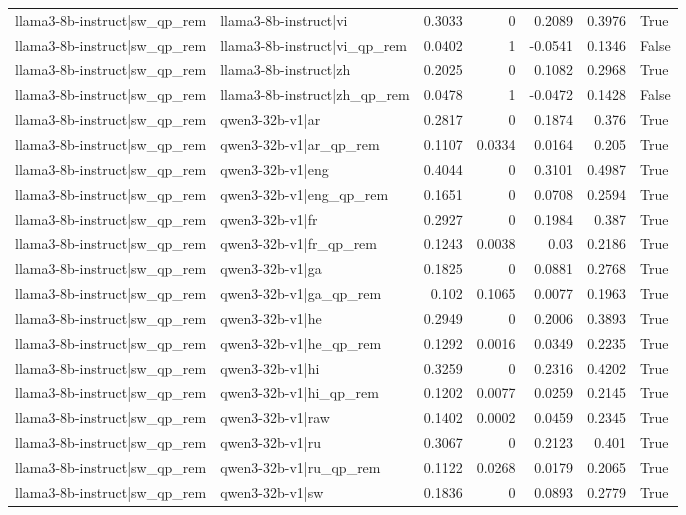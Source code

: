 \begin{table}
\begin{tabular}{l l r r r r l}
llama3-8b-instruct|sw_qp_rem & llama3-8b-instruct|vi & 0.3033 & 0 & 0.2089 & 0.3976 & True \\
llama3-8b-instruct|sw_qp_rem & llama3-8b-instruct|vi_qp_rem & 0.0402 & 1 & -0.0541 & 0.1346 & False \\
llama3-8b-instruct|sw_qp_rem & llama3-8b-instruct|zh & 0.2025 & 0 & 0.1082 & 0.2968 & True \\
llama3-8b-instruct|sw_qp_rem & llama3-8b-instruct|zh_qp_rem & 0.0478 & 1 & -0.0472 & 0.1428 & False \\
llama3-8b-instruct|sw_qp_rem & qwen3-32b-v1|ar & 0.2817 & 0 & 0.1874 & 0.376 & True \\
llama3-8b-instruct|sw_qp_rem & qwen3-32b-v1|ar_qp_rem & 0.1107 & 0.0334 & 0.0164 & 0.205 & True \\
llama3-8b-instruct|sw_qp_rem & qwen3-32b-v1|eng & 0.4044 & 0 & 0.3101 & 0.4987 & True \\
llama3-8b-instruct|sw_qp_rem & qwen3-32b-v1|eng_qp_rem & 0.1651 & 0 & 0.0708 & 0.2594 & True \\
llama3-8b-instruct|sw_qp_rem & qwen3-32b-v1|fr & 0.2927 & 0 & 0.1984 & 0.387 & True \\
llama3-8b-instruct|sw_qp_rem & qwen3-32b-v1|fr_qp_rem & 0.1243 & 0.0038 & 0.03 & 0.2186 & True \\
llama3-8b-instruct|sw_qp_rem & qwen3-32b-v1|ga & 0.1825 & 0 & 0.0881 & 0.2768 & True \\
llama3-8b-instruct|sw_qp_rem & qwen3-32b-v1|ga_qp_rem & 0.102 & 0.1065 & 0.0077 & 0.1963 & True \\
llama3-8b-instruct|sw_qp_rem & qwen3-32b-v1|he & 0.2949 & 0 & 0.2006 & 0.3893 & True \\
llama3-8b-instruct|sw_qp_rem & qwen3-32b-v1|he_qp_rem & 0.1292 & 0.0016 & 0.0349 & 0.2235 & True \\
llama3-8b-instruct|sw_qp_rem & qwen3-32b-v1|hi & 0.3259 & 0 & 0.2316 & 0.4202 & True \\
llama3-8b-instruct|sw_qp_rem & qwen3-32b-v1|hi_qp_rem & 0.1202 & 0.0077 & 0.0259 & 0.2145 & True \\
llama3-8b-instruct|sw_qp_rem & qwen3-32b-v1|raw & 0.1402 & 0.0002 & 0.0459 & 0.2345 & True \\
llama3-8b-instruct|sw_qp_rem & qwen3-32b-v1|ru & 0.3067 & 0 & 0.2123 & 0.401 & True \\
llama3-8b-instruct|sw_qp_rem & qwen3-32b-v1|ru_qp_rem & 0.1122 & 0.0268 & 0.0179 & 0.2065 & True \\
llama3-8b-instruct|sw_qp_rem & qwen3-32b-v1|sw & 0.1836 & 0 & 0.0893 & 0.2779 & True \\

\end{tabular}
\end{table}

